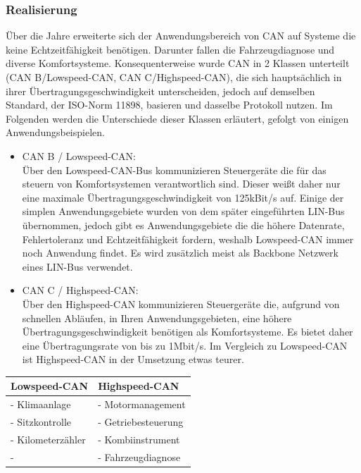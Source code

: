     \subsubsection{Realisierung}
    Über die Jahre erweiterte sich der Anwendungsbereich von CAN auf Systeme
    die keine Echtzeitfähigkeit benötigen. Darunter fallen die Fahrzeugdiagnose und diverse 
    Komfortsysteme. Konsequenterweise wurde CAN in 2 Klassen unterteilt (CAN B/Lowspeed-CAN, 
    CAN C/Highspeed-CAN), die sich hauptsächlich in ihrer Übertragungsgeschwindigkeit 
    unterscheiden, jedoch auf demselben Standard, der ISO-Norm 11898, basieren und dasselbe 
    Protokoll nutzen. Im Folgenden werden die Unterschiede dieser Klassen erläutert, gefolgt von 
    einigen Anwendungsbeispielen.
    \begin{itemize}
        \item{CAN B / Lowspeed-CAN:}\\
        Über den Lowspeed-CAN-Bus kommunizieren Steuergeräte die für das steuern von 
        Komfortsystemen verantwortlich sind. Dieser weißt daher nur eine maximale 
        Übertragungsgeschwindigkeit von 125kBit/s auf. Einige der simplen Anwendungsgebiete wurden
        von dem später eingeführten LIN-Bus übernommen, jedoch gibt es Anwendungsgebiete die 
        die höhere Datenrate, Fehlertoleranz und Echtzeitfähigkeit fordern, weshalb Lowspeed-CAN immer 
        noch Anwendung findet.
        Es wird zusätzlich meist als Backbone Netzwerk eines LIN-Bus verwendet.
        ~\cite{reif2011bosch}
        \item{CAN C / Highspeed-CAN:}\\
        Über den Highspeed-CAN kommunizieren Steuergeräte die, aufgrund von schnellen Abläufen, in 
        Ihren Anwendungsgebieten, eine höhere Übertragungsgeschwindigkeit benötigen als
        Komfortsysteme. Es bietet daher eine Übertragungsrate von bis zu 1Mbit/s.
        Im Vergleich zu Lowspeed-CAN ist Highspeed-CAN in der Umsetzung etwas teurer.
        ~\cite{reif2011bosch}
    \end{itemize}
    \begin{center}
    \begin{tabular}{p{5.5cm} p{5.5cm}}
    \hline
    Lowspeed-CAN & Highspeed-CAN\\
    \hline
    \hline - Klimaanlage & - Motormanagement\\
    \hline - Sitzkontrolle & - Getriebesteuerung\\
    \hline - Kilometerzähler & - Kombiinstrument\\
    \hline - & - Fahrzeugdiagnose\\
    \hline
    \end{tabular}            
    \end{center}
